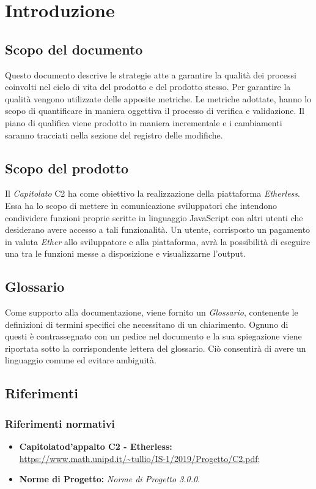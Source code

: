 \setlength\LTleft{0cm}
\section{Introduzione}

\subsection{Scopo del documento}
Questo documento descrive le strategie atte a garantire la qualità dei processi coinvolti nel ciclo di vita del prodotto e del prodotto stesso. Per garantire la qualità vengono utilizzate delle apposite metriche. Le metriche adottate, hanno lo scopo di quantificare in maniera oggettiva il processo di verifica e validazione. Il piano di qualifica viene prodotto in maniera incrementale e i cambiamenti saranno tracciati nella sezione del registro delle modifiche.


\subsection{Scopo del prodotto}
Il \textit{Capitolato\glo} C2 ha come obiettivo la realizzazione della piattaforma \textit{Etherless}. Essa ha lo scopo di mettere in comunicazione sviluppatori che intendono condividere funzioni proprie scritte in linguaggio JavaScript con altri utenti che desiderano avere accesso a tali funzionalità. Un utente, corrisposto un pagamento in valuta \textit{Ether\glo} allo sviluppatore e alla piattaforma, avrà la possibilità di eseguire una tra le funzioni messe a disposizione e visualizzarne l'output.

\subsection{Glossario}
Come supporto alla documentazione, viene fornito un \textit{Glossario}\docs,
contenente le definizioni di termini specifici che necessitano di un chiarimento.
Ognuno di questi è contrassegnato con un pedice \glo nel documento e la sua
spiegazione viene riportata sotto la corrispondente lettera del glossario. Ciò
consentir\`a di avere un linguaggio comune ed evitare ambiguità.

\subsection{Riferimenti}
\subsubsection{Riferimenti normativi}
\begin{itemize}
\item \textbf{Capitolato\glo d'appalto C2 - Etherless:} \url{https://www.math.unipd.it/~tullio/IS-1/2019/Progetto/C2.pdf};
\item \textbf{Norme di Progetto:} \textit{Norme di Progetto 3.0.0\docs}.
\end{itemize}
